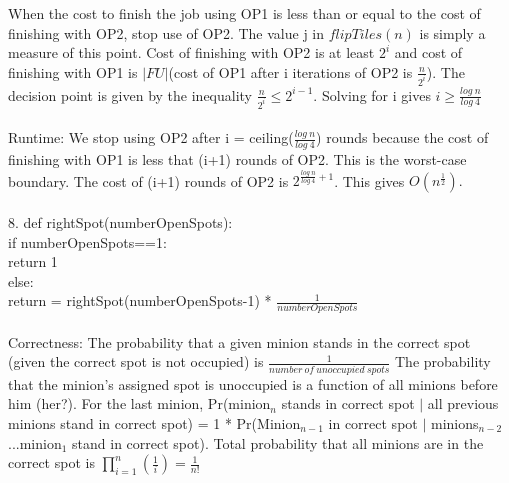 \documentclass[11pt, oneside]{article}   	%
\begin{document}
\indent When the cost to finish the job using OP1 is less than or equal to the cost of finishing with OP2, stop use of OP2.  The value j in $flipTiles(n)$ is simply a measure of this point.  Cost of finishing with OP2 is at least $2^i$ and cost of finishing with OP1 is $|FU|$(cost of OP1 after i iterations of OP2 is $\frac{n}{2^i}$).  The decision point is given by the inequality $\frac{n}{2^i} \leq 2^{i-1}$.  Solving for i gives $i\geq \frac{log\ n}{log\ 4}$\\\\
Runtime:  We stop using OP2 after i = ceiling($\frac{log\ n}{log\ 4}$) rounds because the cost of finishing with OP1 is less that (i+1) rounds of OP2.  This is the worst-case boundary.  The cost of (i+1) rounds of OP2 is $2^{\frac{log\ n}{log\ 4}+1}$.  This gives $O(n^{\frac{1}{2}}).$\\
\\
8.  def rightSpot(numberOpenSpots):\\
\indent\indent if numberOpenSpots==1:\\
\indent\indent\indent return 1\\
\indent\indent else:\\
\indent\indent\indent return = rightSpot(numberOpenSpots-1) * $\frac{1}{numberOpenSpots}$\\\\
\indent Correctness:  The probability that a given minion stands in the correct spot (given the correct spot is not occupied) is $\frac{1}{number\ of\ unoccupied\ spots}$  The probability that the minion's assigned spot is unoccupied is a function of all minions before him (her?).  For the last minion, Pr(minion$_n$ stands in correct spot $|$ all previous minions stand in correct spot) = 1 * Pr(Minion$_{n-1}$ in correct spot $|$ minions$_{n-2}$...minion$_1$ stand in correct spot).  Total probability that all minions are in the correct spot is $\prod_{i=1}^n(\frac{1}{i}) = \frac{1}{n!}$\\

\end{document}

